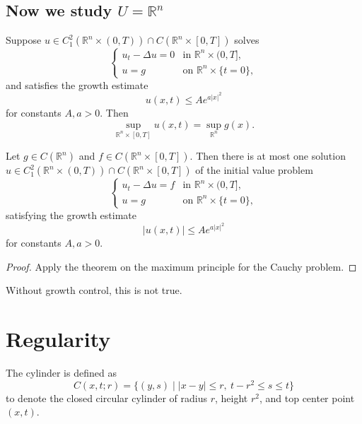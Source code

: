 \subsection*{Now we study $U=\mathbb{R}^n$}

\begin{theorem}
Suppose
$
u\in C_1^2(\mathbb{R}^n\times (0,T))\cap C(\mathbb{R}^n\times [0,T])
$
solves
$$
\begin{cases}
u_t-\Delta u=0 & \text{in } \mathbb{R}^n\times (0,T],\\
u=g & \text{on } \mathbb{R}^n\times \{t=0\},
\end{cases}
$$
and satisfies the growth estimate
$$
u(x,t)\le A e^{a|x|^2}
$$
for constants $A,a>0$.
Then
$$
\sup_{\mathbb{R}^n\times [0,T]}u(x,t)=\sup_{\mathbb{R}^n}g(x).
$$
\end{theorem}


\begin{theorem}
Let
$
g\in C(\mathbb{R}^n)
$
and
$
f\in C(\mathbb{R}^n\times [0,T]).
$
Then there is at most one solution
$
u\in C_1^2(\mathbb{R}^n\times (0,T))\cap C(\mathbb{R}^n\times [0,T])
$
of the initial value problem
$$
\begin{cases}
u_t-\Delta u=f & \text{in } \mathbb{R}^n\times (0,T],\\
u=g & \text{on } \mathbb{R}^n\times \{t=0\},
\end{cases}
$$
satisfying the growth estimate
$$
|u(x,t)|\le A e^{a|x|^2}
$$
for constants $A,a>0$.
\end{theorem}

\begin{proof}
Apply the theorem on the maximum principle for the Cauchy problem.
\end{proof}

\begin{remark}
Without growth control, this is not true.
\end{remark}

\section{Regularity}

\begin{definition}
    The cylinder is defined as $$C(x,t;r)=\{(y,s)\mid |x-y|\le r,\ t-r^2\le s\le t\}$$
    to denote the closed circular cylinder of radius $r$, height $r^2$, and top center point $(x,t)$.
\end{definition}

